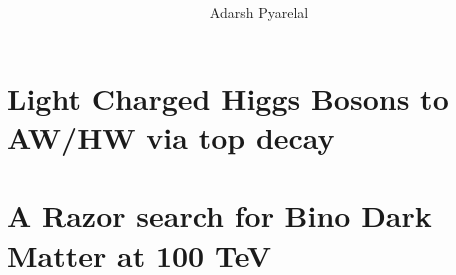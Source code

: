 \documentclass[final,twoside,10pt]{memoir}
\title{\scshape\color{Maroon}{\MakeTextLowercase{Searches for New Physics at Colliders}}}
\author{Adarsh Pyarelal}
\date{}
\theoremstyle{definition}
\theoremstyle{theorem}
\begin{document}




\cleardoublepage
\tableofcontents*
\cleardoublepage
\listoffigures*
\cleardoublepage
\listoftables*
\cleardoublepage






\appendix
\appendixpage



\chapter{Light Charged Higgs Bosons to AW/HW via top decay}
%
\chapter{A Razor search for Bino Dark Matter at 100 TeV}
%
\printbibliography

\end{document}
